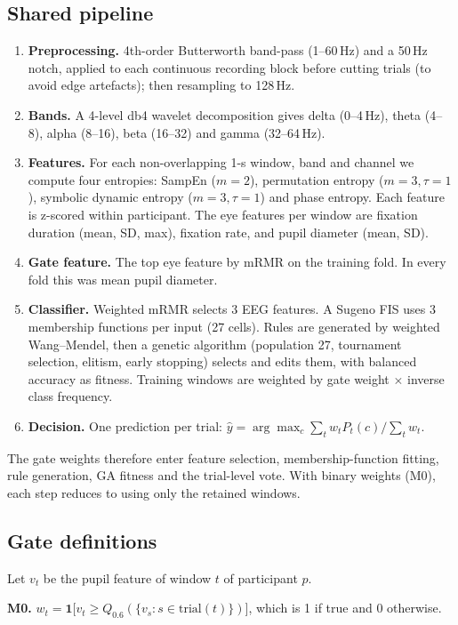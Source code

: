 \documentclass[10pt,a4paper]{article}
\begin{document}
\subsection{Shared pipeline}
\begin{enumerate}
  \item \textbf{Preprocessing.} 4th-order Butterworth band-pass (1--60\,Hz) and a 50\,Hz notch, applied to each continuous recording block before cutting trials (to avoid edge artefacts); then resampling to 128\,Hz.
  \item \textbf{Bands.} A 4-level db4 wavelet decomposition gives delta (0--4\,Hz), theta (4--8), alpha (8--16), beta (16--32) and gamma (32--64\,Hz).
  \item \textbf{Features.} For each non-overlapping 1-s window, band and channel we compute four entropies: SampEn ($m{=}2$), permutation entropy ($m{=}3,\tau{=}1$), symbolic dynamic entropy ($m{=}3,\tau{=}1$) and phase entropy. Each feature is z-scored within participant. The eye features per window are fixation duration (mean, SD, max), fixation rate, and pupil diameter (mean, SD).
  \item \textbf{Gate feature.} The top eye feature by mRMR on the training fold. In every fold this was mean pupil diameter.
  \item \textbf{Classifier.} Weighted mRMR selects 3 EEG features. A Sugeno FIS uses 3 membership functions per input (27 cells). Rules are generated by weighted Wang--Mendel, then a genetic algorithm (population 27, tournament selection, elitism, early stopping) selects and edits them, with balanced accuracy as fitness. Training windows are weighted by gate weight $\times$ inverse class frequency.
  \item \textbf{Decision.} One prediction per trial: $\hat{y}=\arg\max_c \sum_t w_t P_t(c)/\sum_t w_t$.
\end{enumerate}
The gate weights therefore enter feature selection, membership-function fitting, rule generation, GA fitness and the trial-level vote. With binary weights (M0), each step reduces to using only the retained windows.

\subsection{Gate definitions}
Let $v_t$ be the pupil feature of window $t$ of participant $p$.

\textbf{M0.} $w_t=\mathbf{1}\big[v_t\ge Q_{0.6}(\{v_s: s\in \mathrm{trial}(t)\})\big]$, which is 1 if true and 0 otherwise.
\end{document}
